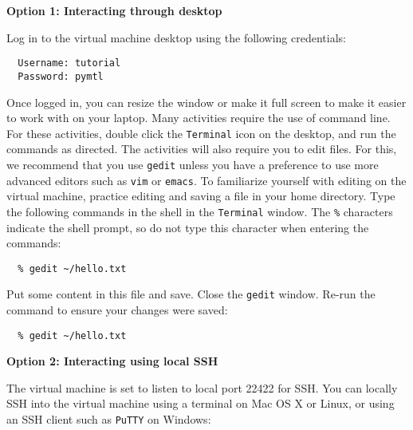 \documentclass[11pt]{article}
\begin{document}
\bigskip\smallskip
{\large \textbf{Option 1: Interacting through desktop}}

\medskip\smallskip
Log in to the virtual machine desktop using the following credentials:

\vspace{-0.05in}
\begin{verbatim}
  Username: tutorial
  Password: pymtl
\end{verbatim}
\vspace{-0.05in}

Once logged in, you can resize the window or make it full screen to make
it easier to work with on your laptop. Many activities require the use of
command line. For these activities, double click the \texttt{Terminal}
icon on the desktop, and run the commands as directed. The activities
will also require you to edit files. For this, we recommend that you use
\texttt{gedit} unless you have a preference to use more advanced editors
such as \texttt{vim} or \texttt{emacs}. To familiarize yourself with
editing on the virtual machine, practice editing and saving a file in
your home directory. Type the following commands in the shell in the
\texttt{Terminal} window. The \texttt{\%} characters indicate the shell
prompt, so do not type this character when entering the commands:

\vspace{-0.05in}
\begin{verbatim}
  % gedit ~/hello.txt
\end{verbatim}
\vspace{-0.05in}

Put some content in this file and save. Close the \texttt{gedit} window.
Re-run the command to ensure your changes were saved:

\vspace{-0.05in}
\begin{verbatim}
  % gedit ~/hello.txt
\end{verbatim}
\vspace{-0.05in}

\newpage
{\large \textbf{Option 2: Interacting using local SSH}}

\medskip\smallskip The virtual machine is set to listen to local port
22422 for SSH. You can locally SSH into the virtual machine using a
terminal on Mac OS X or Linux, or using an SSH client such as
\texttt{PuTTY} on Windows:
\end{document}
